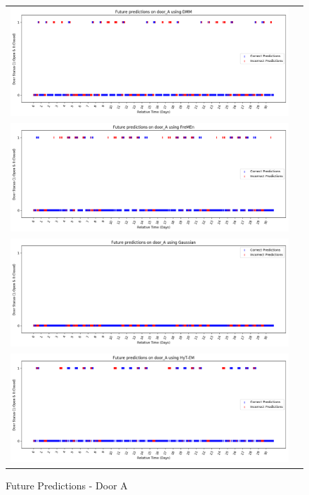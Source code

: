 \begin{center}
\begin{figure}[!Hp]
  \begin{tabular}{cc}
    {\includegraphics[width = 6in]{images/results/Future_door_A_DMM.png}} \\
    {\includegraphics[width = 6in]{images/results/Future_door_A_FreMEn.png}} \\
    {\includegraphics[width = 6in]{images/results/Future_door_A_Gaussian.png}} \\
    {\includegraphics[width = 6in]{images/results/Future_door_A_HyT-EM.png}} \\
  \end{tabular}
  \caption{Future Predictions - Door A}
  \label{figure:future_door_A}
\end{figure} \\ \\


\end{center}
